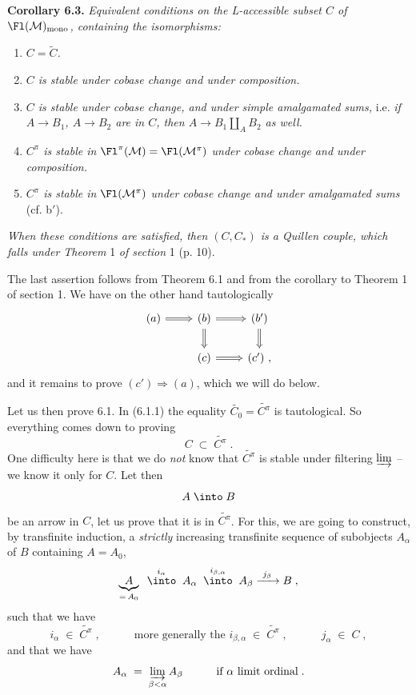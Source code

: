 \textbf{Corollary 6.3.} \textit{Equivalent conditions on the L-accessible subset $C$ of} $\Fl(\mathcal{M})_{\mathrm{mono}}$\textit{, containing the isomorphisms:}
\begin{enumerate}[label={}]
\item[a)] \textit{$C = \widetilde{C}$.}
\item[b)] \textit{$C$ is stable under cobase change and under composition.}
\item[b$'$)] \textit{$C$ is stable under cobase change, and under simple amalgamated sums,} i.e. \textit{if $A \longrightarrow B_{1}$, $A \longrightarrow B_{2}$ are in $C$, then $A \longrightarrow B_{1} \amalg_{A} B_{2}$ as well.}
\item[c)] \textit{$C^{\pi}$ is stable in} $\Fl^{\pi}(\mathcal{M}) = \Fl(\mathcal{M}^{\pi})$ \textit{under cobase change and under composition.}
\item[c$'$)] \textit{$C^{\pi}$ is stable in} $\Fl(\mathcal{M}^{\pi})$ \textit{under cobase change and under amalgamated sums} (cf. b$'$).
\end{enumerate}
\textit{When these conditions are satisfied, then $(C,C_{*})$ is a Quillen couple, which falls under Theorem} 1 \textit{of section} 1 (p. 10).

The last assertion follows from Theorem 6.1 and from the corollary to Theorem 1 of section 1. We have
%
on the other hand tautologically
\[
\begin{tikzcd}
(a) \arrow[r, Rightarrow] & (b) \arrow[r, Rightarrow] \arrow[d, Rightarrow] & (b') \arrow[d, Rightarrow] \\
 & (c) \arrow[r, Rightarrow] & (c') \ ,
\end{tikzcd}
\]
and it remains to prove $(c') \Longrightarrow (a)$, which we will do below.

Let us then prove 6.1. In (6.1.1) the equality $\widetilde{C_{0}} = \widetilde{C^{\pi}}$ is tautological. So everything comes down to proving
\[
C \;\subset\; \widetilde{C^{\pi}} \; .
\]
One difficulty here is that we do \textit{not} know that $\widetilde{C^{\pi}}$ is stable under filtering $\varinjlim$ -- we know it only for $C$. Let then
\[
A \;\into\; B
\]
be an arrow in $C$, let us prove that it is in $\widetilde{C^{\pi}}$. For this, we are going to construct, by transfinite induction, a \textit{strictly} increasing transfinite sequence of subobjects $A_{\alpha}$ of $B$ containing $A = A_{0}$,
\[
\underbrace{A}_{=\,A_{0}} \;\; \overset{i_{\alpha}}{\into} \;\; A_{\alpha} \;\; \overset{i_{\beta,\alpha}}{\into} \;\; A_{\beta} \xrightarrow{\ j_{\beta}\ } B \; ,
\]
such that we have
\[
i_{\alpha} \;\in\; \widetilde{C^{\pi}} \; , \qquad\quad \text{more generally the } i_{\beta,\alpha} \;\in\; \widetilde{C^{\pi}} \; , \qquad\quad j_{\alpha} \;\in\; C \; ,
\]
and that we have
\[
A_{\alpha} \;=\; \varinjlim_{\beta<\alpha} A_{\beta} \qquad\quad \text{if } \alpha \text{ limit ordinal} \; .
\]

